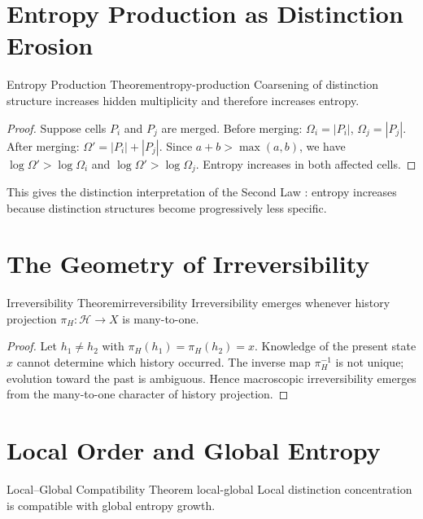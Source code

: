 \documentclass[12pt,twoside,openright]{book}
\newcommand{\hist}{\mathcal{H}}
\begin{document}
\section{Entropy Production as Distinction Erosion}
\label{sec:ch3-production}

\begin{theorem}{Entropy Production Theorem}{entropy-production}
  Coarsening of distinction structure increases hidden
  multiplicity and therefore increases entropy.
\end{theorem}

\begin{proof}
  Suppose cells $P_i$ and $P_j$ are merged. Before
  merging: $\Omega_i = |P_i|$, $\Omega_j = |P_j|$.
  After merging: $\Omega' = |P_i| + |P_j|$.
  Since $a + b > \max(a,b)$, we have $\log\Omega' >
  \log\Omega_i$ and $\log\Omega' > \log\Omega_j$.
  Entropy increases in both affected cells.
\end{proof}

This gives the distinction interpretation of the Second
Law \parencite{prigogine1984}: entropy increases because
distinction structures become progressively less specific.

\section{The Geometry of Irreversibility}
\label{sec:ch3-irrev}

\begin{theorem}{Irreversibility Theorem}{irreversibility}
  Irreversibility emerges whenever history projection
  $\pi_H: \hist \to X$ is many-to-one.
\end{theorem}

\begin{proof}
  Let $h_1 \ne h_2$ with $\pi_H(h_1) = \pi_H(h_2) = x$.
  Knowledge of the present state $x$ cannot determine
  which history occurred. The inverse map $\pi_H^{-1}$
  is not unique; evolution toward the past is ambiguous.
  Hence macroscopic irreversibility emerges from the
  many-to-one character of history projection.
\end{proof}

\section{Local Order and Global Entropy}
\label{sec:ch3-local}

\begin{theorem}{Local--Global Compatibility Theorem}%
  {local-global}
  Local distinction concentration is compatible with
  global entropy growth.
\end{theorem}
\end{document}
